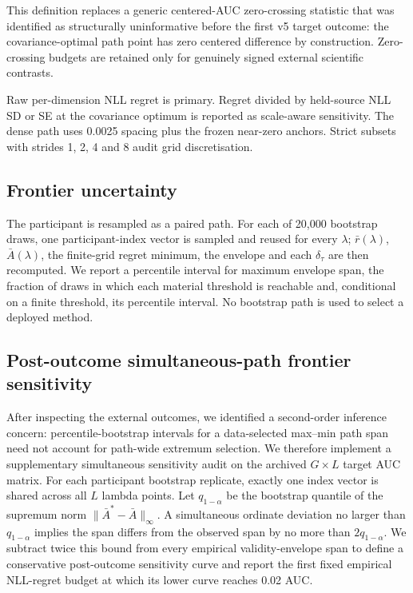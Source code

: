 This definition replaces a generic centered-AUC zero-crossing statistic that
was identified as structurally uninformative before the first v5 target
outcome: the covariance-optimal path point has zero centered difference by
construction. Zero-crossing budgets are retained only for genuinely signed
external scientific contrasts.

Raw per-dimension NLL regret is primary. Regret divided by held-source NLL SD
or SE at the covariance optimum is reported as scale-aware sensitivity. The
dense path uses 0.0025 spacing plus the frozen near-zero anchors. Strict
subsets with strides 1, 2, 4 and 8 audit grid discretisation.

\subsection{Frontier uncertainty}
The participant is resampled as a paired path. For each of 20,000 bootstrap
draws, one participant-index vector is sampled and reused for every
\(\lambda\); \(\bar r(\lambda)\), \(\bar A(\lambda)\), the finite-grid
regret minimum, the envelope and each \(\delta_\tau\) are then recomputed.
We report a percentile interval for maximum envelope span, the fraction of
draws in which each material threshold is reachable and, conditional on a
finite threshold, its percentile interval. No bootstrap path is used to
select a deployed method.

\subsection{Post-outcome simultaneous-path frontier sensitivity}
After inspecting the external outcomes, we identified a second-order
inference concern: percentile-bootstrap intervals for a data-selected
max--min path span need not account for path-wide extremum selection.
We therefore implement a supplementary simultaneous sensitivity audit on
the archived \(G\times L\) target AUC matrix. For each participant bootstrap
replicate, exactly one index vector is shared across all \(L\) lambda points.
Let \(q_{1-\alpha}\) be the bootstrap quantile of the supremum norm
\(\|\bar A^*-\bar A\|_\infty\). A simultaneous ordinate deviation no
larger than \(q_{1-\alpha}\) implies the span differs from the observed
span by no more than \(2q_{1-\alpha}\). We subtract twice this bound from
every empirical validity-envelope span to define a conservative
post-outcome sensitivity curve and report the first fixed empirical
NLL-regret budget at which its lower curve reaches 0.02 AUC.

